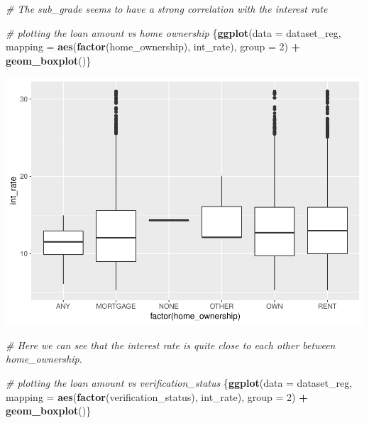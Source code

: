 \documentclass[]{article}
\newenvironment{Shaded}{\begin{snugshade}}{\end{snugshade}}
\newcommand{\CommentTok}[1]{\textcolor[rgb]{0.56,0.35,0.01}{\textit{#1}}}
\newcommand{\DataTypeTok}[1]{\textcolor[rgb]{0.13,0.29,0.53}{#1}}
\newcommand{\DecValTok}[1]{\textcolor[rgb]{0.00,0.00,0.81}{#1}}
\newcommand{\KeywordTok}[1]{\textcolor[rgb]{0.13,0.29,0.53}{\textbf{#1}}}
\newcommand{\NormalTok}[1]{#1}
\newcommand{\OperatorTok}[1]{\textcolor[rgb]{0.81,0.36,0.00}{\textbf{#1}}}
\newcommand{\StringTok}[1]{\textcolor[rgb]{0.31,0.60,0.02}{#1}}
\begin{document}
\begin{Shaded}
\begin{Highlighting}[]
\CommentTok{# The sub_grade seems to have a strong correlation with the interest rate}
\end{Highlighting}
\end{Shaded}

\begin{Shaded}
\begin{Highlighting}[]
\CommentTok{# plotting the loan amount vs home ownership}
\NormalTok{\{}\KeywordTok{ggplot}\NormalTok{(}\DataTypeTok{data =}\NormalTok{ dataset_reg, }\DataTypeTok{mapping =} \KeywordTok{aes}\NormalTok{(}\KeywordTok{factor}\NormalTok{(home_ownership), int_rate), }\DataTypeTok{group =} \DecValTok{2}\NormalTok{) }\OperatorTok{+}
\StringTok{  }\KeywordTok{geom_boxplot}\NormalTok{()\}}
\end{Highlighting}
\end{Shaded}

\includegraphics{Machine_learning_Group_7_files/figure-latex/Data Exploration - interest rate vs home ownership-1.pdf}

\begin{Shaded}
\begin{Highlighting}[]
\CommentTok{# Here we can see that the interest rate is quite close to each other between home_ownership.}
\end{Highlighting}
\end{Shaded}

\begin{Shaded}
\begin{Highlighting}[]
\CommentTok{# plotting the loan amount vs verification_status}
\NormalTok{\{}\KeywordTok{ggplot}\NormalTok{(}\DataTypeTok{data =}\NormalTok{ dataset_reg, }\DataTypeTok{mapping =} \KeywordTok{aes}\NormalTok{(}\KeywordTok{factor}\NormalTok{(verification_status), int_rate), }\DataTypeTok{group =} \DecValTok{2}\NormalTok{) }\OperatorTok{+}
\StringTok{  }\KeywordTok{geom_boxplot}\NormalTok{()\}}
\end{Highlighting}
\end{Shaded}
\end{document}
